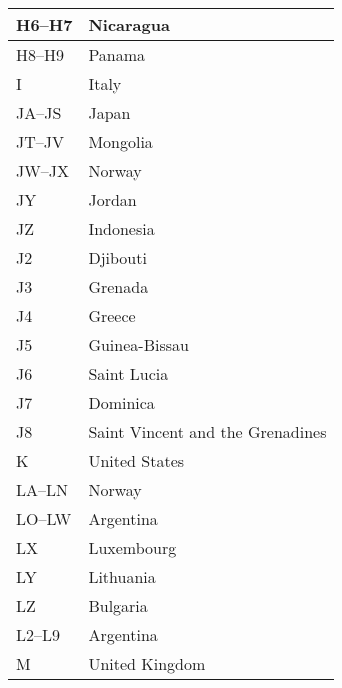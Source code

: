 \begin{longtable}{|l|l|}
  H6--H7              & Nicaragua                                 \\
  \hline
  H8--H9              & Panama                                    \\
  \hline
  I                   & Italy                                     \\
  \hline
  JA--JS              & Japan                                     \\
  \hline
  JT--JV              & Mongolia                                  \\
  \hline
  JW--JX              & Norway                                    \\
  \hline
  JY                  & Jordan                                    \\
  \hline
  JZ                  & Indonesia                                 \\
  \hline
  J2                  & Djibouti                                  \\
  \hline
  J3                  & Grenada                                   \\
  \hline
  J4                  & Greece                                    \\
  \hline
  J5                  & Guinea-Bissau                             \\
  \hline
  J6                  & Saint Lucia                               \\
  \hline
  J7                  & Dominica                                  \\
  \hline
  J8                  & Saint Vincent and the Grenadines          \\
  \hline
  K                   & United States                             \\
  \hline
  LA--LN              & Norway                                    \\
  \hline
  LO--LW              & Argentina                                 \\
  \hline
  LX                  & Luxembourg                                \\
  \hline
  LY                  & Lithuania                                 \\
  \hline
  LZ                  & Bulgaria                                  \\
  \hline
  L2--L9              & Argentina                                 \\
  \hline
  M                   & United Kingdom                            \\

\end{longtable}
